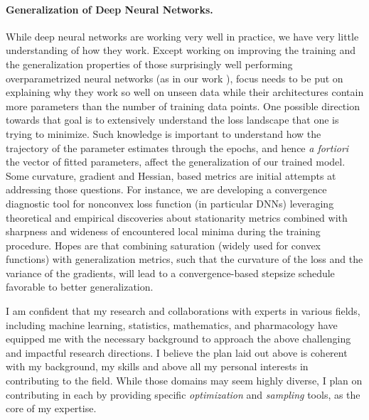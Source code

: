 \documentclass[twoside,11pt]{article}
\begin{document}
\vspace{0.08in}
\paragraph{Generalization of Deep Neural Networks.} 
While deep neural networks are working very well in practice, we have very little understanding of how they work. 
Except working on improving the training and the generalization properties of those surprisingly well performing overparametrized neural networks (as in our work  \citep{zhou2020towards}), focus needs to be put on explaining why they work so well on unseen data while their architectures contain more parameters than the number of training data points. 
One possible direction towards that goal is to extensively understand the loss landscape that one is trying to minimize.
Such knowledge is important to understand how the trajectory of the parameter estimates through the epochs, and hence \emph{a fortiori} the vector of fitted parameters, affect the generalization of our trained model.
Some curvature, gradient and Hessian, based metrics are initial attempts at addressing those questions.
For instance, we are developing a convergence diagnostic tool for nonconvex loss function (in particular DNNs) leveraging theoretical and empirical discoveries about stationarity metrics combined with sharpness and wideness of encountered local minima during the training procedure.
Hopes are that combining saturation (widely used for convex functions) with generalization metrics, such that the curvature of the loss and the variance of the gradients, will lead to a convergence-based stepsize schedule favorable to better generalization.


\vspace{0.2in}
\textbf{} 
\vspace{0.2in}

I am confident that my research and collaborations with experts in various fields, including machine learning, statistics, mathematics, and pharmacology have equipped me with the necessary background to approach the above challenging and impactful research directions.
I believe the plan laid out above is coherent with my background, my skills and above all my personal interests in contributing to the field.
While those domains may seem highly diverse, I plan on contributing in each by providing specific \emph{optimization} and \emph{sampling} tools, as the core of my expertise.





\newpage
\textbf{}
\vspace{-0.3in}


\end{document}
